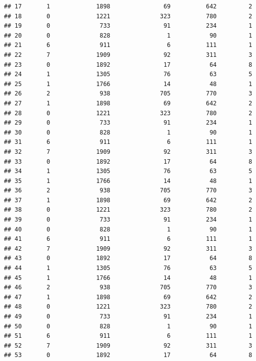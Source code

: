 \documentclass[
]{article}
\begin{document}
\begin{verbatim}
## 17       1             1898               69          642         2
## 18       0             1221              323          780         2
## 19       0              733               91          234         1
## 20       0              828                1           90         1
## 21       6              911                6          111         1
## 22       7             1909               92          311         3
## 23       0             1892               17           64         8
## 24       1             1305               76           63         5
## 25       1             1766               14           48         1
## 26       2              938              705          770         3
## 27       1             1898               69          642         2
## 28       0             1221              323          780         2
## 29       0              733               91          234         1
## 30       0              828                1           90         1
## 31       6              911                6          111         1
## 32       7             1909               92          311         3
## 33       0             1892               17           64         8
## 34       1             1305               76           63         5
## 35       1             1766               14           48         1
## 36       2              938              705          770         3
## 37       1             1898               69          642         2
## 38       0             1221              323          780         2
## 39       0              733               91          234         1
## 40       0              828                1           90         1
## 41       6              911                6          111         1
## 42       7             1909               92          311         3
## 43       0             1892               17           64         8
## 44       1             1305               76           63         5
## 45       1             1766               14           48         1
## 46       2              938              705          770         3
## 47       1             1898               69          642         2
## 48       0             1221              323          780         2
## 49       0              733               91          234         1
## 50       0              828                1           90         1
## 51       6              911                6          111         1
## 52       7             1909               92          311         3
## 53       0             1892               17           64         8

\end{verbatim}
\end{document}
